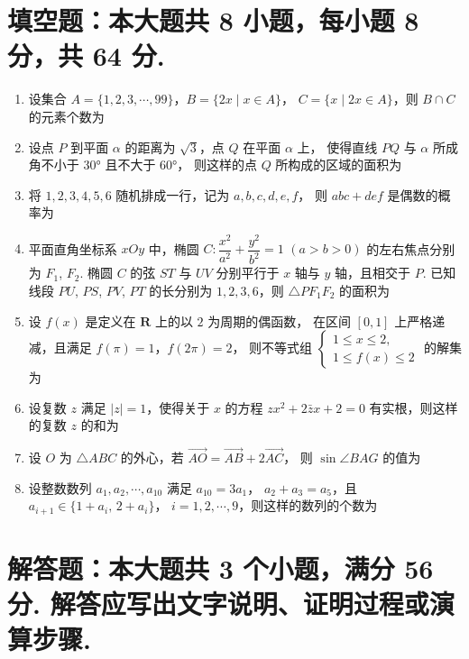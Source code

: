 \documentclass{chsmc}
\begin{document}
\section{填空题：本大题共 8 小题，每小题 8 分，共 64 分.}

\begin{enumerate}
  \item 设集合 $A = \{1, 2, 3, \cdots, 99\}$，$B = \{2x \mid x \in A\}$，
    $C = \{x \mid 2x \in A\}$，则 $B \cap C$ 的元素个数为 \blankline
  \item 设点 $P$ 到平面 $\alpha$ 的距离为 $\sqrt{3}$，点 $Q$ 在平面 $\alpha$ 上，
    使得直线 $PQ$ 与 $\alpha$ 所成角不小于 $30°$ 且不大于 $60°$，
    则这样的点 $Q$ 所构成的区域的面积为 \blankline
  \item 将 $1, 2, 3, 4, 5, 6$ 随机排成一行，记为 $a, b, c, d, e, f$，
    则 $abc + def$ 是偶数的概率为 \blankline
  \item 平面直角坐标系 $xOy$ 中，椭圆 $C\colon \dfrac{x^2}{a^2} + \dfrac{y^2}{b^2} = 1$
    $(a > b > 0)$ 的左右焦点分别为 $F_1$, $F_2$. 椭圆 $C$ 的弦 $ST$ 与 $UV$
    分别平行于 $x$ 轴与 $y$ 轴，且相交于 $P$. 已知线段 $PU$, $PS$, $PV$, $PT$
    的长分别为 $1, 2, 3, 6$，则 $\triangle PF_1F_2$ 的面积为 \blankline
  \item 设 $f(x)$ 是定义在 $\mathbf{R}$ 上的以 $2$ 为周期的偶函数，
    在区间 $[0,1]$ 上严格递减，且满足 $f(\pi) = 1$，$f(2\pi) = 2$，
    则不等式组
    $\begin{cases}
      1 \leqslant x \leqslant 2, \\
      1 \leqslant f(x) \leqslant 2
    \end{cases}$
    的解集为 \blankline
  \item 设复数 $z$ 满足 $|z| = 1$，使得关于 $x$ 的方程
    $zx^2 + 2\bar{z}x + 2 = 0$ 有实根，则这样的复数 $z$ 的和为 \blankline
  \item 设 $O$ 为 $\triangle ABC$ 的外心，若 $\overrightarrow{AO} = \overrightarrow{AB} + 2\overrightarrow{AC}$，
    则 $\sin\angle BAG$ 的值为 \blankline
  \item 设整数数列 $a_1, a_2, \cdots, a_{10}$ 满足 $a_{10} = 3a_1$，
    $a_2 + a_3 = a_5$，且 $a_{i+1} \in \{1 + a_i,\, 2 + a_i\}$，
    $i = 1, 2, \cdots, 9$，则这样的数列的个数为 \blankline
\end{enumerate}

\section{解答题：本大题共 3 个小题，满分 56 分. 解答应写出文字说明、证明过程或演算步骤.}
\end{document}
